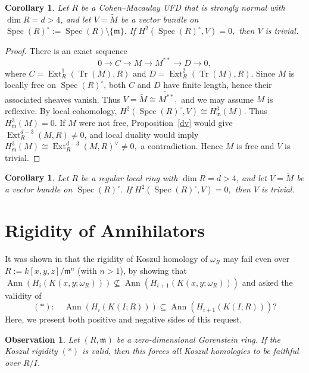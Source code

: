 \documentclass[11pt,a4paper]{amsart}
\numberwithin{equation}{section}
\newtheorem{corollary}[theorem]{Corollary}
\newtheorem{observation}[theorem]{Observation}
\DeclareMathOperator{\Ann}{Ann}\DeclareMathOperator{\ann}{Ann}
\DeclareMathOperator{\Spec}{Spec}
\DeclareMathOperator{\Tr}{Tr}\DeclareMathOperator{\tr}{tr}
\DeclareMathOperator{\Ext}{Ext}
\newcommand{\fm}{\mathfrak{m}}
\begin{document}
\begin{corollary}
	Let $R$ be a Cohen–Macaulay UFD that is strongly normal with $\dim R=d>4$, and let $V=\widetilde{M}$ be a vector bundle on
	\(
	\Spec(R)^\circ:=\Spec(R)\setminus\{\fm\}.
	\)
	If
	\(
	H^2(\Spec(R)^\circ,V)=0,
	\)
	then $V$ is trivial.
\end{corollary}

\begin{proof}
	There is an exact sequence
	\[
	0 \longrightarrow C \longrightarrow M \longrightarrow M^{**} \longrightarrow D \longrightarrow 0,
	\]
	where $C=\Ext^1_R(\Tr(M),R)$ and $D=\Ext^2_R(\Tr(M),R)$. Since $M$ is locally free on $\Spec(R)^\circ$, both $C$ and $D$ have finite length, hence their associated sheaves vanish. Thus
	\(
	V=\widetilde{M}\cong \widetilde{M^{**}},
	\)
	and we may assume $M$ is reflexive.
	By local cohomology,
	\(
	H^2(\Spec(R)^\circ,V)\cong H^3_{\fm}(M).
	\)
	Thus $H^3_{\fm}(M)=0$. If $M$ were not free, Proposition~\ref{dv} would give $\Ext^{d-3}_R(M,R)\neq 0$, and local duality would imply
	\(
	H^3_{\fm}(M)\cong \Ext^{d-3}_R(M,R)^{\vee}\neq 0,
	\)
	a contradiction. Hence $M$ is free and $V$ is trivial.
\end{proof}

\begin{corollary}\label{76}
	Let $R$ be a regular local ring with $\dim R=d>4$, and let $V=\widetilde{M}$ be a vector bundle on $\Spec(R)^\circ$. If
	\(
	H^2(\Spec(R)^\circ,V)=0,
	\)
	then $V$ is trivial.
\end{corollary}

	\maketitle
	
\section{Rigidity of Annihilators}\label{s2.1}


It was shown in \cite[\S 1]{corso} that the rigidity of Koszul homology of $\omega_R$  may fail even over $R:=k[x,y,z]/ \fm^n$ (with $n>1$), by showing that $\Ann(H_i(K(x,y; \omega_R)))\nsubseteq\Ann(H_{i+1}(K(x,y; \omega_R)))$ and asked the validity of $$(\ast):\quad\Ann(H_i(K(I;  R)))\subseteq\Ann(H_{i+1}(K(I; R)))? $$ Here, we present both positive and negative sides of this request.

\begin{observation}\label{o212}
	Let $(R,\fm)$ be a zero-dimensional Gorenstein ring. If the  Koszul rigidity $(\ast)$ is valid, then this forces all Koszul homologies to be faithful over $R/I$.
\end{observation}
\end{document}
